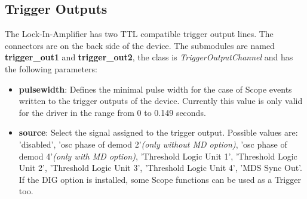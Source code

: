 \documentclass[11pt]{article} %
\begin{document}
\subsection{Trigger Outputs}
The Lock-In-Amplifier has two TTL compatible trigger output lines. The connectors are on the back side of the device. The submodules are named {\bf trigger\_out1} and {\bf trigger\_out2}, the class is {\it TriggerOutputChannel} and has the following parameters:
\begin{itemize}
\item {\bf pulsewidth}: Defines the minimal pulse width for the case of Scope events written to the trigger outputs of the device. Currently this value is only valid for the driver in the range from 0 to 0.149 seconds.
\item {\bf source}: Select the signal assigned to the trigger output. Possible values are: 'disabled', 'osc phase of demod 2'{\it (only without MD option)}, 'osc phase of demod 4'{\it (only with MD option)}, 'Threshold Logic Unit 1', 'Threshold Logic Unit 2', 'Threshold Logic Unit 3', 'Threshold Logic Unit 4', 'MDS Sync Out'. If the DIG option is installed, some Scope functions can be used as a Trigger too.
\end{itemize}
\end{document}
